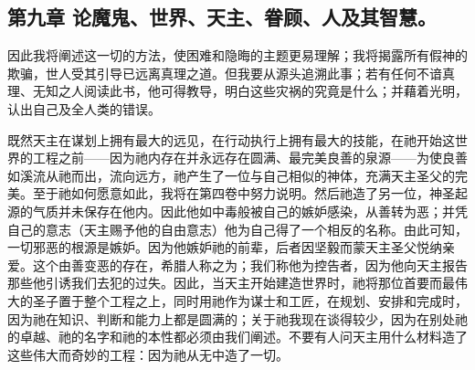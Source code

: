
\subsection{第九章 论魔鬼、世界、天主、眷顾、人及其智慧。}

因此我将阐述这一切的方法，使困难和隐晦的主题更易理解；我将揭露所有假神的欺骗，世人受其引导已远离真理之道。但我要从源头追溯此事；若有任何不谙真理、无知之人阅读此书，他可得教导，明白这些灾祸的究竟是什么；并藉着光明，认出自己及全人类的错误。\par

既然天主在谋划上拥有最大的远见，在行动执行上拥有最大的技能，在祂开始这世界的工程之前——因为祂内存在并永远存在圆满、最完美良善的泉源——为使良善如溪流从祂而出，流向远方，祂产生了一位与自己相似的神体，充满天主圣父的完美。至于祂如何愿意如此，我将在第四卷中努力说明。然后祂造了另一位，神圣起源的气质并未保存在他内。因此他如中毒般被自己的嫉妒感染，从善转为恶；并凭自己的意志（天主赐予他的自由意志）他为自己得了一个相反的名称。由此可知，一切邪恶的根源是嫉妒。因为他嫉妒祂的前辈，后者因坚毅而蒙天主圣父悦纳亲爱。这个由善变恶的存在，希腊人称之为；我们称他为控告者，因为他向天主报告那些他引诱我们去犯的过失。因此，当天主开始建造世界时，祂将那位首要而最伟大的圣子置于整个工程之上，同时用祂作为谋士和工匠，在规划、安排和完成时，因为祂在知识、判断和能力上都是圆满的；关于祂我现在谈得较少，因为在别处祂的卓越、祂的名字和祂的本性都必须由我们阐述。不要有人问天主用什么材料造了这些伟大而奇妙的工程：因为祂从无中造了一切。\par


